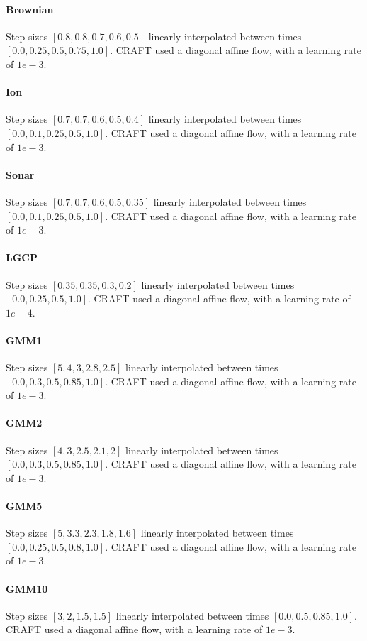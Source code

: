 \documentclass{article}
\theoremstyle{plain}
\theoremstyle{definition}
\theoremstyle{remark}
\begin{document}
\paragraph{Brownian} Step sizes $[0.8,0.8,0.7,0.6,0.5]$ linearly interpolated between times $[0.0, 0.25, 0.5, 0.75, 1.0]$. CRAFT used a diagonal affine flow, with a learning rate of $1e-3$.
\paragraph{Ion} Step sizes $[0.7, 0.7, 0.6, 0.5, 0.4]$ linearly interpolated between times $[0.0, 0.1, 0.25, 0.5, 1.0]$. CRAFT used a diagonal affine flow, with a learning rate of $1e-3$.
\paragraph{Sonar} Step sizes $[0.7, 0.7, 0.6, 0.5, 0.35]$ linearly interpolated between times $[0.0, 0.1, 0.25, 0.5, 1.0]$. CRAFT used a diagonal affine flow, with a learning rate of $1e-3$.
\paragraph{LGCP} Step sizes $[0.35, 0.35, 0.3, 0.2]$ linearly interpolated between times $[0.0, 0.25, 0.5, 1.0]$. CRAFT used a diagonal affine flow, with a learning rate of $1e-4$.
\paragraph{GMM1} Step sizes $[5, 4, 3, 2.8, 2.5]$ linearly interpolated between times $[0.0, 0.3, 0.5, 0.85, 1.0]$. CRAFT used a diagonal affine flow, with a learning rate of $1e-3$.
\paragraph{GMM2} Step sizes $[4, 3, 2.5, 2.1, 2]$ linearly interpolated between times $[0.0, 0.3, 0.5, 0.85, 1.0]$. CRAFT used a diagonal affine flow, with a learning rate of $1e-3$.
\paragraph{GMM5} Step sizes $[5, 3.3, 2.3, 1.8, 1.6]$ linearly interpolated between times $[0.0, 0.25, 0.5, 0.8, 1.0]$. CRAFT used a diagonal affine flow, with a learning rate of $1e-3$.
\paragraph{GMM10} Step sizes $[3, 2, 1.5, 1.5]$ linearly interpolated between times $[0.0, 0.5, 0.85, 1.0]$. CRAFT used a diagonal affine flow, with a learning rate of $1e-3$.
\end{document}
